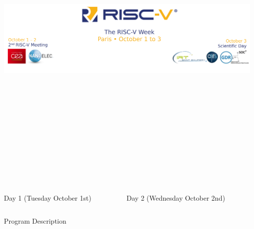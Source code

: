 \documentclass{beamer}
\begin{document}
\begin{frame}[t]
    \begin{center}
    \includegraphics[height=15cm]{./images/banner.png}
    \end{center}

    \begin{columns}[t]
    \begin{column}{\firstcolwidth}
        \begin{block}{\centering Day 1 (Tuesday October 1st) }
            \vspace{1cm}
            {\tiny  }
        \end{block}
    \end{column}

    \begin{column}{\othercolwidth}
        \begin{block}{\centering Day 2 (Wednesday October 2nd) }
            \vspace{1cm}
            {\tiny  }
        \end{block}
    \end{column}
    \end{columns}

    \begin{block}{\centering Program Description}
    \begin{tiny}
    \begin{multicols}{3}
        
    \end{multicols}
    \end{tiny}

    \end{block}

\end{frame}
\end{document}
